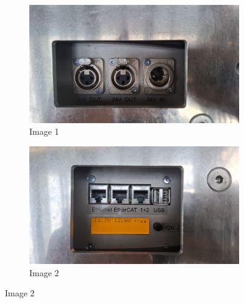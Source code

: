\begin{figure}[ht]
        \centering

        \begin{subfigure}[t]{0.49\linewidth}
            \centering
            \includegraphics[width=\linewidth]{images/sec2/youbot_power.jpg}
            \caption{Image 1}
        \end{subfigure}
        \hfill
        \begin{subfigure}[t]{0.49\linewidth}
            \centering
            \includegraphics[width=\linewidth]{images/sec2/youbot_screen.jpg}
            \caption{Image 2}
        \end{subfigure}

        \vspace{0.5em}  %


\end{figure}
